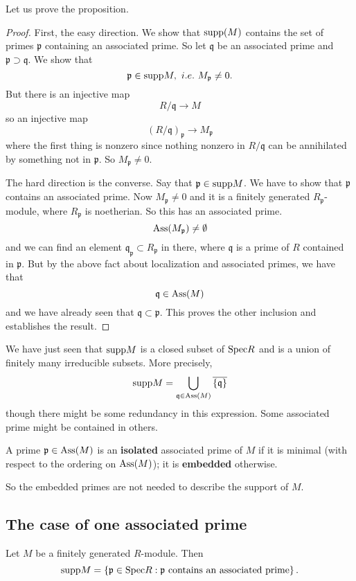 Let us prove the proposition.
\begin{proof} 
First, the easy direction. We show that $\mathrm{supp}(M)$ contains the set of primes
$\mathfrak{p}$ containing an associated prime. So let $\mathfrak{q}$ be an
associated prime and $\mathfrak{p} \supset \mathfrak{q}$. We show that
\[ \mathfrak{p} \in \supp M, \ i.e. \ M_{\mathfrak{p}} \neq 0.  \]
But there is an injective map
\[ R/\mathfrak{q} \to M  \]
so an injective map
\[ (R/\mathfrak{q})_{\mathfrak{p}} \to M_{\mathfrak{p}}  \]
where the first thing is nonzero since nothing nonzero in $R/\mathfrak{q}$ can be
annihilated by something not in $\mathfrak{p}$. So $M_{\mathfrak{p}} \neq 0$. 

The hard direction is the converse. Say that $\mathfrak{p} \in \mathrm{supp} M$. We
have to show that $\mathfrak{p}$ contains an associated prime.  
Now $M_{\mathfrak{p}} \neq 0$ and it is a finitely generated $R_{\mathfrak{p}}$-module, where
$R_{\mathfrak{p}}$ is noetherian. So this has an associated prime. 
\[ \mathrm{Ass}(M_{\mathfrak{p}}) \neq \emptyset  \]
and we can find an element $\mathfrak{q}_{\mathfrak{p}} \subset
R_{\mathfrak{p}}$ in there, where
$\mathfrak{q}$ is a prime of $R$ contained in $\mathfrak{p}$. But by the above
fact about localization and associated primes, we have that 
\[ \mathfrak{q} \in \mathrm{Ass}(M)  \]
and we have already seen that $\mathfrak{q} \subset \mathfrak{p}$. This proves
the other inclusion and establishes the result. 
\end{proof} 

We have just seen that $\mathrm{supp} M$ is a closed subset of $\mathrm{Spec} R$ and is a union
of finitely many irreducible subsets.  More precisely, 
\[ \mathrm{supp} M = \bigcup_{\mathfrak{q} \in \mathrm{Ass}(M)}
\overline{\left\{\mathfrak{q}\right\}}  \]
though there might be some redundancy in this expression. Some associated prime might be contained
in others.  

\begin{definition} 
A prime $\mathfrak{p} \in \mathrm{Ass}(M)$ is an \textbf{isolated} associated prime of
$M$ if it is minimal (with respect to the ordering on $\mathrm{Ass}(M)$); it is
\textbf{embedded} otherwise. 
\end{definition} 

So the embedded primes are not needed to describe the support of $M$. 

\subsection{The case of one associated prime}
\begin{proposition} 
Let $M$ be a finitely generated $R$-module. Then 
\[ \mathrm{supp} M = \left\{\mathfrak{p} \in \mathrm{Spec} R: \mathfrak{p} \
\mathrm{contains \ an \ associated \ prime}\right\} . \]
\end{proposition} 



